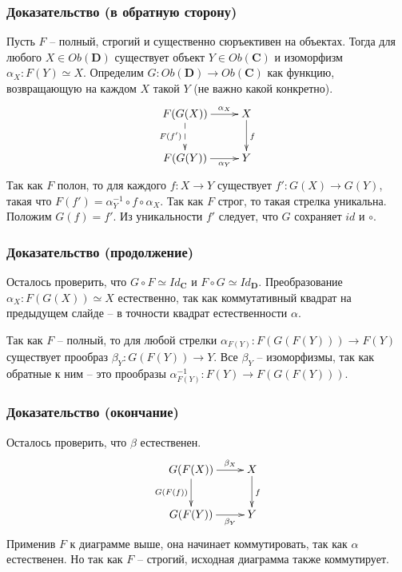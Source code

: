 \documentclass{beamer}
\theoremstyle{definition}
\newcommand{\cat}[1]{\mathbf{#1}}
\renewcommand{\C}{\cat{C}}
\newcommand{\D}{\cat{D}}
\begin{document}
\begin{frame}
\frametitle{Доказательство (в обратную сторону)}
Пусть $F$ -- полный, строгий и существенно сюръективен на объектах.
Тогда для любого $X \in Ob(\D)$ существует объект $Y \in Ob(\C)$ и изоморфизм $\alpha_X : F(Y) \simeq X$.
Определим $G : Ob(\D) \to Ob(\C)$ как функцию, возвращающую на каждом $X$ такой $Y$ (не важно какой конкретно).
\[ \xymatrix{ F(G(X)) \ar[r]^-{\alpha_X} \ar@{-->}[d]_{F(f')} & X \ar[d]^f \\
              F(G(Y)) \ar[r]_-{\alpha_Y}                      & Y
            } \]
Так как $F$ полон, то для каждого $f : X \to Y$ существует $f' : G(X) \to G(Y)$, такая что $F(f') = \alpha^{-1}_Y \circ f \circ \alpha_X$.
Так как $F$ строг, то такая стрелка уникальна.
Положим $G(f) = f'$.
Из уникальности $f'$ следует, что $G$ сохраняет $id$ и $\circ$.
\end{frame}

\begin{frame}
\frametitle{Доказательство (продолжение)}
Осталось проверить, что $G \circ F \simeq Id_\C$ и $F \circ G \simeq Id_\D$.
Преобразование $\alpha_X : F(G(X)) \simeq X$ естественно, так как коммутативный квадрат на предыдущем слайде -- в точности квадрат естественности $\alpha$.

Так как $F$ -- полный, то для любой стрелки $\alpha_{F(Y)} : F(G(F(Y))) \to F(Y)$ существует прообраз $\beta_Y : G(F(Y)) \to Y$.
Все $\beta_Y$ -- изоморфизмы, так как обратные к ним -- это прообразы $\alpha^{-1}_{F(Y)} : F(Y) \to F(G(F(Y)))$.
\end{frame}

\begin{frame}
\frametitle{Доказательство (окончание)}
Осталось проверить, что $\beta$ естественен.
\[ \xymatrix{ G(F(X)) \ar[r]^-{\beta_X} \ar[d]_{G(F(f))} & X \ar[d]^f \\
              G(F(Y)) \ar[r]_-{\beta_Y}                  & Y
            } \]
Применив $F$ к диаграмме выше, она начинает коммутировать, так как $\alpha$ естественен.
Но так как $F$ -- строгий, исходная диаграмма также коммутирует.
\end{frame}
\end{document}
